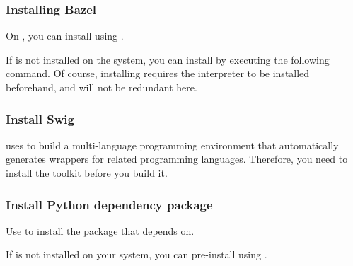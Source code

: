 \begin{content}
\subsubsection{Installing Bazel}

On , you can install  using .


If  is not installed on the system, you can install  by executing the following command. Of course, installing  requires the  interpreter to be installed beforehand, and will not be redundant here.


\subsubsection{Install Swig}

 uses  to build a multi-language programming environment that automatically generates wrappers for related programming languages. Therefore, you need to install the  toolkit before you build it.


\subsubsection{Install Python dependency package}

Use  to install the  package that  depends on.


If  is not installed on your system, you can pre-install  using .


\end{content}
